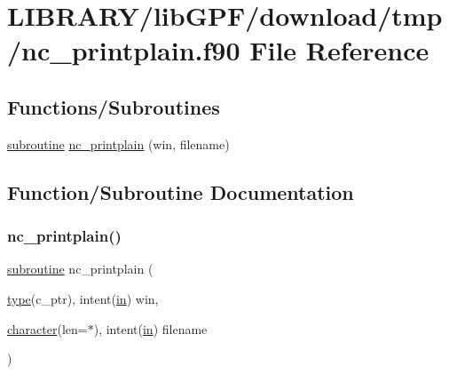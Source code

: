 \hypertarget{nc__printplain_8f90}{}\section{L\+I\+B\+R\+A\+R\+Y/lib\+G\+P\+F/download/tmp/nc\+\_\+printplain.f90 File Reference}
\label{nc__printplain_8f90}
\subsection*{Functions/\+Subroutines}
\begin{DoxyCompactItemize}
\item 
\hyperlink{M__stopwatch_83_8txt_acfbcff50169d691ff02d4a123ed70482}{subroutine} \hyperlink{nc__printplain_8f90_aba4329f91d99b9519c4f1da36ca2962f}{nc\+\_\+printplain} (win, filename)
\end{DoxyCompactItemize}


\subsection{Function/\+Subroutine Documentation}
\mbox{\label{nc__printplain_8f90_aba4329f91d99b9519c4f1da36ca2962f}} 
\subsubsection{\texorpdfstring{nc\+\_\+printplain()}{nc\_printplain()}}
{\footnotesize\ttfamily \hyperlink{M__stopwatch_83_8txt_acfbcff50169d691ff02d4a123ed70482}{subroutine} nc\+\_\+printplain (\begin{DoxyParamCaption}\item[{\hyperlink{stop__watch_83_8txt_a70f0ead91c32e25323c03265aa302c1c}{type}(c\+\_\+ptr), intent(\hyperlink{M__journal_83_8txt_afce72651d1eed785a2132bee863b2f38}{in})}]{win,  }\item[{\hyperlink{option__stopwatch_83_8txt_abd4b21fbbd175834027b5224bfe97e66}{character}(len=$\ast$), intent(\hyperlink{M__journal_83_8txt_afce72651d1eed785a2132bee863b2f38}{in})}]{filename }\end{DoxyParamCaption})}



